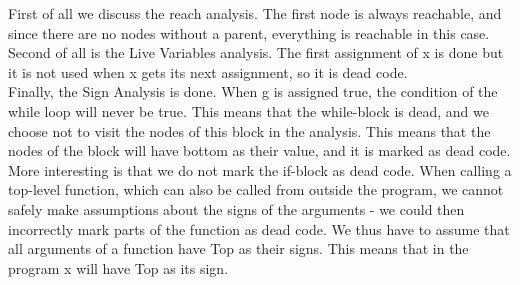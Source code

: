 \documentclass[10pt]{article}
\begin{document}
First of all we discuss the reach analysis. The first node is always reachable, and since there are no nodes without a parent, everything is reachable in this case.\\
Second of all is the Live Variables analysis. The first assignment of x is done but it is not used when x gets its next assignment, so it is dead code.\\
Finally, the Sign Analysis is done. When g is assigned true, the condition of the while loop will never be true. This means that the while-block is dead, and we choose not to visit the nodes of this block in the analysis. This means that the nodes of the block will have bottom as their value, and it is marked as dead code.\\
More interesting is that we do not mark the if-block as dead code. When calling a top-level function, which can also be called from outside the program, we cannot safely make assumptions about the signs of the arguments - we could then incorrectly mark parts of the function as dead code. We thus have to assume that all arguments of a function have Top as their signs. This means that in the program x will have Top as its sign.
\end{document}
